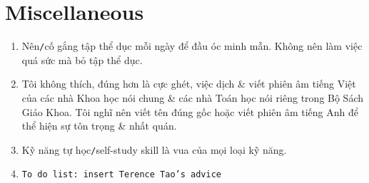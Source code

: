 \documentclass{article}
\numberwithin{equation}{section}
\begin{document}

\section{Miscellaneous}

\begin{enumerate}
	\item Nên\texttt{/}cố gắng tập thể dục mỗi ngày để đầu óc minh mẫn. Không nên làm việc quá sức mà bỏ tập thể dục.
	\item Tôi không thích, đúng hơn là cực ghét, việc dịch \& viết phiên âm tiếng Việt của các nhà Khoa học nói chung \& các nhà Toán học nói riêng trong Bộ Sách Giáo Khoa. Tôi nghĩ nên viết tên đúng gốc hoặc viết phiên âm tiếng Anh để thể hiện sự tôn trọng \& nhất quán.
	\item Kỹ năng tự học\texttt{/}self-study skill là vua của mọi loại kỹ năng.
	\item \texttt{To do list: insert Terence Tao's advice}
\end{enumerate}


\printbibliography[heading=bibintoc]
	
\end{document}
